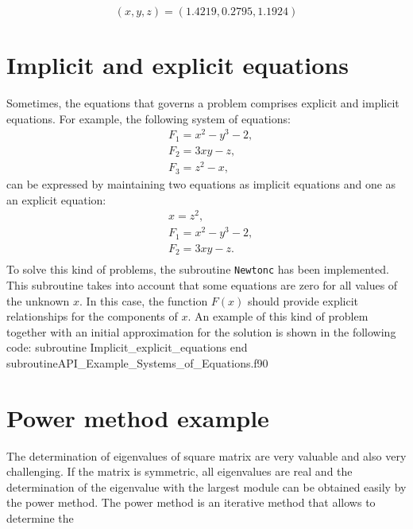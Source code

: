     \begin{equation*}
    	(x,y,z)= (1.4219,   0.2795,	1.1924)
    \end{equation*}
    
\section{Implicit and explicit equations} 
    Sometimes, the equations that governs a problem comprises explicit and implicit equations. For example, 
    the following system of equations:  
    \begin{align*}
    &	F_1 = x^2 - y^3 - 2,\\
    &   F_2 = 3xy - z,\\
    &   F_3 = z^2 -x,
    \end{align*}
     can be expressed by maintaining two equations as implicit equations and one as an explicit equation: 
    \begin{align*} 
        &   x =  z^2, \\
        &	F_1 = x^2 - y^3 - 2,\\
        &   F_2 = 3xy - z.\\
    \end{align*}
    To solve this kind of problems, the subroutine \verb|Newtonc| has been implemented. This subroutine takes into account that some equations are zero for all values of the unknown $x$. In this case, the function $ F (x) $ should provide explicit relationships for the components of $ x $. 
    An example of this kind of problem together with an initial approximation for the solution is shown in the following code: 
    \vspace{0.5cm} 
    {subroutine Implicit_explicit_equations}
    {end subroutine}{API_Example_Systems_of_Equations.f90}
 
   
\section{Power method example} 

    The determination of eigenvalues of square matrix are very valuable and also very challenging. If the matrix is symmetric, all eigenvalues are real and the determination of the eigenvalue with the largest module can be obtained easily by the power method.
    The power method is an iterative method that allows to determine the     
    
